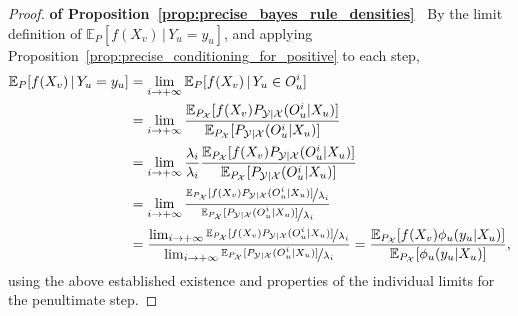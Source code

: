\documentclass[twoside,11pt]{article}
\newcommand{\states}{\mathcal{X}}
\newcommand{\observs}{\mathcal{Y}}
\begin{document}
\begin{proof}{\bf of Proposition~\ref{prop:precise_bayes_rule_densities}~}
By the limit definition of $\mathbb{E}_P[f(X_v)\,\vert\,Y_u=y_u]$, and applying Proposition~\ref{prop:precise_conditioning_for_positive} to each step,
\begin{align*}
\mathbb{E}_P[f(X_v)\,\vert\,Y_u=y_u] &= \lim_{i\to+\infty} \mathbb{E}_P[f(X_v)\,\vert\,Y_u\in O_u^i] \\
 &= \lim_{i\to+\infty} \frac{\mathbb{E}_{P_\states}[f(X_v)P_{\observs\vert\states}(O_u^i\vert X_u)]}{\mathbb{E}_{P_\states}[P_{\observs\vert\states}(O_u^i\vert X_u)]} \\
 &= \lim_{i\to+\infty} \frac{\lambda_i}{\lambda_i}\frac{\mathbb{E}_{P_\states}[f(X_v)P_{\observs\vert\states}(O_u^i\vert X_u)]}{\mathbb{E}_{P_\states}[P_{\observs\vert\states}(O_u^i\vert X_u)]} \\
 &= \lim_{i\to+\infty} \frac{\nicefrac{\mathbb{E}_{P_\states}[f(X_v)P_{\observs\vert\states}(O_u^i\vert X_u)]}{\lambda_i}}{\nicefrac{\mathbb{E}_{P_\states}[P_{\observs\vert\states}(O_u^i\vert X_u)]}{\lambda_i}} \\
 &= \frac{\lim_{i\to+\infty} \nicefrac{\mathbb{E}_{P_\states}[f(X_v)P_{\observs\vert\states}(O_u^i\vert X_u)]}{\lambda_i}}{\lim_{i\to+\infty} \nicefrac{\mathbb{E}_{P_\states}[P_{\observs\vert\states}(O_u^i\vert X_u)]}{\lambda_i}}= \frac{\mathbb{E}_{P_\states}[f(X_v)\phi_u(y_u\vert X_u)]}{\mathbb{E}_{P_\states}[\phi_u(y_u\vert X_u)]},
\end{align*}
using the above established existence and properties of the individual limits for the penultimate step.

\end{proof}
\end{document}
